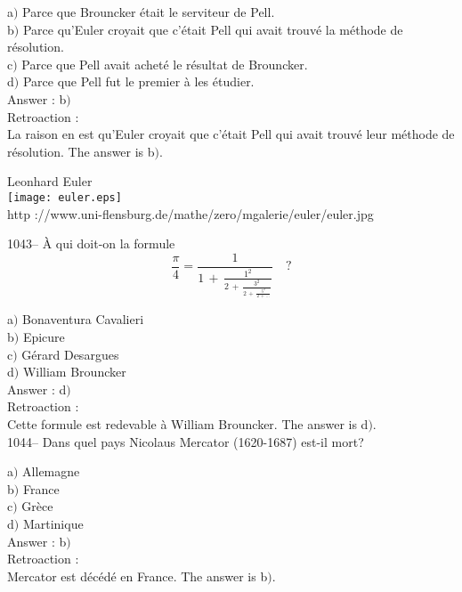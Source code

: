 ﻿\documentclass[letterpaper, 12pt]{article}
\begin{document}
a$)$ Parce que Brouncker \'etait le serviteur de Pell. \\
b$)$ Parce qu'Euler croyait que c'\'etait Pell qui avait trouv\'e la
m\'ethode de r\'esolution.  \\
c$)$ Parce que Pell avait achet\'e le r\'esultat de Brouncker.  \\
d$)$ Parce que Pell fut le premier \`a les \'etudier.\\

Answer : b$)$\\

Retroaction : \\
La raison en est qu'Euler croyait que c'\'etait Pell qui avait
trouv\'e leur m\'ethode de r\'esolution.
The answer is b$)$.\\
        \begin{center}
        Leonhard Euler\\
    \texttt{[image: euler.eps]}\\
        {\footnotesize http
://www.uni-flensburg.de/mathe/zero/mgalerie/euler/euler.jpg}
    \end{center}

1043-- \`A qui doit-on la formule
$$\displaystyle{\frac{\pi}4=\frac1{1\,+\,\frac{1^2}{2\,+\,\frac{3^2}{2\,+\,\frac{5^2}{2\,+\,\ldots}}}}}\quad?$$

a$)$ Bonaventura Cavalieri \\
b$)$ Epicure \\
c$)$ G\'erard Desargues  \\
d$)$ William Brouncker\\

Answer : d$)$\\

Retroaction : \\
Cette formule est redevable \`a William Brouncker.
The answer is d$)$.\\

1044-- Dans quel pays Nicolaus Mercator (1620-1687) est-il mort?

a$)$ Allemagne \\
b$)$ France  \\
c$)$ Gr\`ece  \\
d$)$ Martinique \\

Answer : b$)$\\

Retroaction : \\
Mercator est d\'ec\'ed\'e en France.
The answer is b$)$.\\
\end{document}
